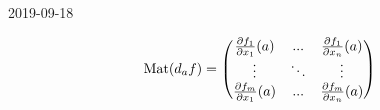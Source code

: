 \documentclass[main]{subfiles}
\begin{document}
\begin{lect}{2019-09-18}
\begin{Definition}
		\[\mathop{\rm Mat}\nolimits(d_af) = \begin{pmatrix}
				\frac{\partial f_1}{\partial x_1}(a) & ...    & \frac{\partial f_1}{\partial x_n} (a) \\
				\vdots                               & \ddots & \vdots                                \\
				\frac{\partial f_m}{\partial x_1}(a) & ...    & \frac{\partial f_m}{\partial x_n} (a)
			\end{pmatrix}\]
	\end{Definition}
\end{lect}
\end{document}
